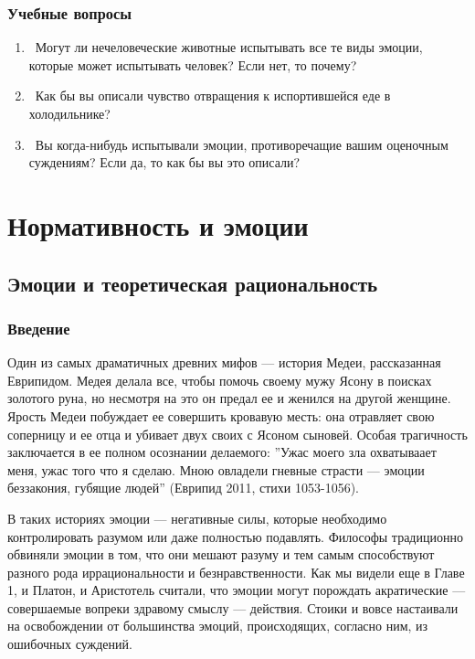 \documentclass[11pt]{book}
\begin{document}
\begin{tcolorbox}
\section{Учебные вопросы}
  \begin{enumerate}
    \item\ Могут ли нечеловеческие животные испытывать все те виды эмоции, которые может испытывать человек? Если нет, то почему?
    \item\ Как бы вы описали чувство отвращения к испортившейся еде в холодильнике?
    \item\ Вы когда-нибудь испытывали эмоции, противоречащие вашим оценочным суждениям? Если да, то как бы вы это описали?
  \end{enumerate}
\end{tcolorbox}

\part{Нормативность и эмоции}

\chapter{Эмоции и теоретическая рациональность}

\section{Введение}

Один из самых драматичных древних мифов --- история Медеи, рассказанная Еврипидом. Медея делала все, чтобы помочь своему мужу Ясону в поисках золотого руна, но несмотря на это он предал ее и женился на другой женщине. Ярость Медеи побуждает ее совершить кровавую месть: она отравляет свою соперницу и ее отца и убивает двух своих с Ясоном сыновей. Особая трагичность заключается в ее полном осознании делаемого: ''Ужас моего зла охватываает меня, ужас того что я сделаю. Мною овладели гневные страсти --- эмоции беззакония, губящие людей'' (Еврипид 2011, стихи 1053-1056).

В таких историях эмоции --- негативные силы, которые необходимо контролировать разумом или даже полностью подавлять. Философы традиционно обвиняли эмоции в том, что они мешают разуму и тем самым способствуют разного рода иррациональности и безнравственности. Как мы видели еще в Главе 1, и Платон, и Аристотель считали, что эмоции могут порождать акратические --- совершаемые вопреки здравому смыслу --- действия. Стоики и вовсе настаивали на освобождении от большинства эмоций, происходящих, согласно ним, из ошибочных суждений.
\end{document}
